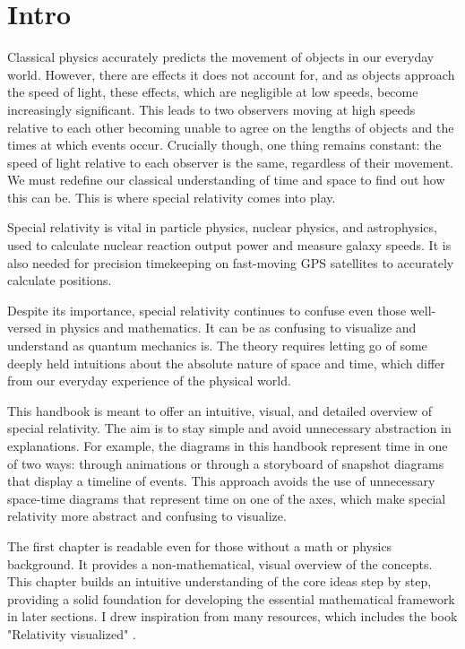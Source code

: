 \frontmatter
\chapter{Intro}

Classical physics accurately predicts the movement of objects in our everyday world.
However, there are effects it does not account for, and as objects approach the speed of light, these effects, which are negligible at low speeds, become increasingly significant.
This leads to two observers moving at high speeds relative to each other becoming unable to agree on the lengths of objects and the times at which events occur.
Crucially though, one thing remains constant: the speed of light relative to each observer is the same, regardless of their movement.
We must redefine our classical understanding of time and space to find out how this can be.
This is where special relativity comes into play.

Special relativity is vital in particle physics, nuclear physics, and astrophysics, used to calculate nuclear reaction output power and measure galaxy speeds.
It is also needed for precision timekeeping on fast-moving GPS satellites to accurately calculate positions.

Despite its importance, special relativity continues to confuse even those well-versed in physics and mathematics.
It can be as confusing to visualize and understand as quantum mechanics is.
The theory requires letting go of some deeply held intuitions about the absolute nature of space and time, which differ from our everyday experience of the physical world.

This handbook is meant to offer an intuitive, visual, and detailed overview of special relativity.
The aim is to stay simple and avoid unnecessary abstraction in explanations.
For example, the diagrams in this handbook represent time in one of two ways: through animations or through a storyboard of snapshot diagrams that display a timeline of events.
This approach avoids the use of unnecessary space-time diagrams that represent time on one of the axes, which make special relativity more abstract and confusing to visualize.

The first chapter is readable even for those without a math or physics background.
It provides a non-mathematical, visual overview of the concepts.
This chapter builds an intuitive understanding of the core ideas step by step, providing a solid foundation for developing the essential mathematical framework in later sections. I drew inspiration from many resources, which includes the book "Relativity visualized" \cite{epstein1985relativity}.

